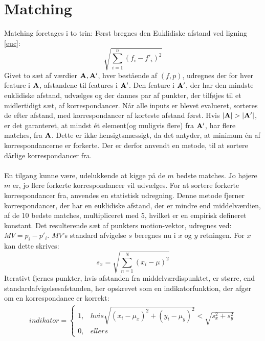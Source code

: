 \section{Matching}
\label{sec:match}
Matching foretages i to trin: Først bregnes den Euklidiske afstand ved ligning \eqref{euc}:
\begin{equation}
\sqrt{\sum\limits_{i=1}^n(f_i-f'_i)^2}
\label{euc}
\end{equation}
Givet to sæt af værdier $\bold{A}, \bold{A}'$, hver bestående af $(f, p)$, udregnes der for hver feature i $\bold{A}$, afstandene til features i $\bold{A}'$. Den feature i $\bold{A}'$, der har den mindste euklidiske afstand, udvælges og der dannes par af punkter, der tilføjes til et midlertidigt sæt, af korrespondancer. Når alle inputs er blevet evalueret, sorteres de efter afstand, med korrespondancer af korteste afstand først. Hvis $|\bold{A}| > |\bold{A}'|$, er det garanteret, at mindst ét element(og muligvis flere) fra $\bold{A}'$, har flere matches, fra $\bold{A}$. Dette er ikke hensigtsmæssigt, da det antyder, at minimum én af korrespondancerne er forkerte. Der er derfor anvendt en metode, til at sortere dårlige korrespondancer fra.
\\
\\
En tilgang kunne være, udelukkende at kigge på de $m$ bedste matches. Jo højere $m$ er, jo flere forkerte korrespondancer vil udvælges. For at sortere forkerte korrespondancer fra, anvendes en statistisk udregning. Denne metode fjerner korrespondancer, der har en euklidiske afstand, der er mindre end middelværdien, af de 10 bedste matches, multipliceret med 5, hvilket er en empirisk defineret konstant. Det resulterende sæt af punkters motion-vektor, udregnes ved: $MV = p_i - p'_i$. 
$MV$'s standard afvigelse $s$ beregnes nu i $x$ og $y$ retningen. For $x$ kan dette skrives: 
\begin{equation}
s_x = \sqrt{ \sum \limits_{n=1}^N (x_i  - \mu)^2 }
\label{pis}
\end{equation}
Iterativt fjernes punkter, hvis afstanden fra middelværdispunktet, er større, end standardafvigelsesafstanden, her opskrevet som en indikatorfunktion, der afgør om en korrespondance er korrekt:
\begin{equation}
\begin{split}
indikator = 
\begin{cases}
1,&hvis \sqrt{(x_i - \mu_x)^2 + (y_i - \mu_y)^2} < \sqrt{s_x^2 + s_y^2} \\
0,& ellers
\end{cases}
\end{split}
\label{indikator}
\end{equation}
